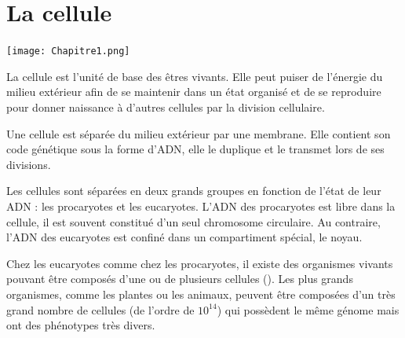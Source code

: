 %
%
%
%
%
\chapter{La cellule}
\begin{center}
\texttt{[image: Chapitre1.png]}
\end{center}

\newpage

La cellule est l'unité de base des êtres vivants. Elle peut puiser de l'énergie du milieu extérieur afin de se maintenir dans un état organisé et de se reproduire pour donner naissance à d'autres cellules par la division cellulaire. 

Une cellule est séparée du milieu extérieur par une membrane. Elle contient son code génétique sous la forme d'ADN, elle le duplique et le transmet lors de ses divisions. 

Les cellules sont séparées en deux grands groupes en fonction de l'état de leur ADN : les procaryotes et les eucaryotes. 
L'ADN des procaryotes est libre dans la cellule, il est souvent constitué d'un seul chromosome circulaire. 
Au contraire, l'ADN des eucaryotes est confiné dans un compartiment spécial, le noyau. 

Chez les eucaryotes comme chez les procaryotes, il existe des organismes vivants pouvant être composés d'une ou de plusieurs cellules (\cite{grosberg_evolution_2007}).
Les plus grands organismes, comme les plantes ou les animaux, peuvent être composées d'un très grand nombre de cellules (de l'ordre de $10^{14}$) qui possèdent le même génome mais ont des phénotypes très divers. 

